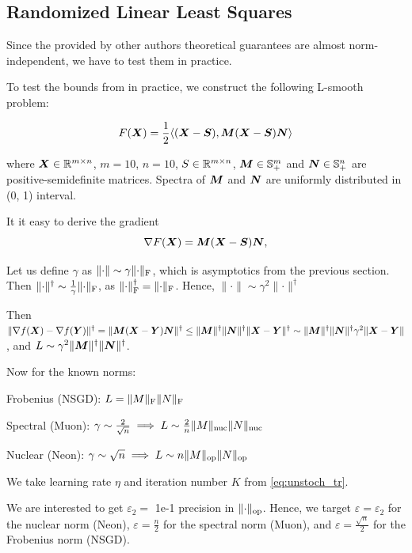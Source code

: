 \documentclass{article} %
\newcommand{\norm}[1]{\lVert #1\rVert}
\renewcommand{\epsilon}{\varepsilon}
\newcommand{\Rmn}{\R^{m\times n}}
\DeclarePairedDelimiter{\normf}{\|}{\|_\mathrm{F}}
\DeclarePairedDelimiter{\norms}{\|}{\|_{\mathrm{op}}}
\DeclarePairedDelimiter{\normn}{\|}{\|_{\mathrm{nuc}}}
\def\<#1,#2>{\langle #1,#2\rangle}
\begin{document}
    \subsection{Randomized Linear Least Squares}
    Since the provided by other authors \cite{kovalev2025understanding,riabinin2025gluon} theoretical guarantees are almost norm-independent, we have to test them in practice.

    To test the bounds from \cite{kovalev2025understanding} in practice, we construct the following L-smooth problem:

    \begin{equation}\label{eq:lls}
        F(\mX) = \frac{1}{2} \<(\mX-\mS), \mM (\mX - \mS) \mN>
    \end{equation}

    where $\mX \in \Rmn$, $m=10$, $n=10$, $S \in \Rmn$, ${\bm{M}} \in \mathbb{S}^m_{+}$ and ${\bm{N}} \in \mathbb{S}^n_{+}$ are positive-semidefinite matrices. Spectra of ${\bm{M}}$ and ${\bm{N}}$ are uniformly distributed in (0, 1) interval.

    It it easy to derive the gradient
    \begin{equation}\label{eq:grad_lls}
        \nabla F({\bm{X}}) = {\bm{M}} ({\bm{X}} - {\bm{S}}) {\bm{N}},
    \end{equation}

    Let us define $\gamma$ as $\norm{\cdot} \sim \gamma \normf{\cdot}$, which is asymptotics from the previous section. Then $\norm{\cdot}^\dagger \sim \frac{1}{\gamma}\normf{\cdot}$, as $\normf{\cdot}^\dagger = \normf{\cdot}$. Hence, $\norm{\cdot} \sim \gamma^2 \norm{\cdot}^\dagger$

    Then $\norm{\nabla f(\mX) - \nabla f(\mY)}^\dagger = \norm{\mM (\mX - \mY) \mN}^\dagger \leq \norm{\mM}^\dagger \norm{\mN}^\dagger \norm{\mX - \mY}^\dagger \sim \norm{\mM}^\dagger \norm{\mN}^\dagger \gamma^2 \norm{\mX - \mY}$, and $L \sim \gamma^2 \norm{\mM}^\dagger \norm{\mN}^\dagger$.
    
    Now for the known norms:

    Frobenius (NSGD): $L = \normf{M} \normf{N}$

    Spectral (Muon): $\gamma \sim \frac{2}{\sqrt{n}} \implies L \sim \frac{2}{n}\normn{M}\normn{N}$
    
    Nuclear (Neon): $\gamma \sim \sqrt{n} \implies L \sim n\norms{M}\norms{N}$

    We take learning rate $\eta$ and iteration number $K$ from \cref{eq:unstoch_tr}.


    We are interested to get $\epsilon_2=$ 1e-1 precision in $\norms{\cdot}$. Hence, we target $\epsilon = \epsilon_2$ for the nuclear norm (Neon), $\epsilon = \frac{n}{2}$ for the spectral norm (Muon), and $\epsilon = \frac{\sqrt{n}}{2}$ for the Frobenius norm (NSGD).
\end{document}

